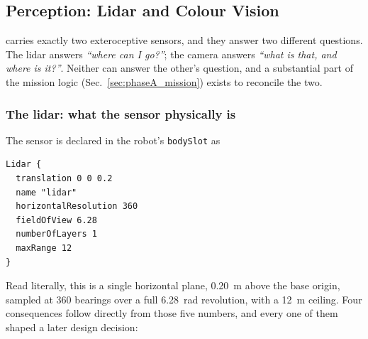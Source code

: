 \subsection{Perception: Lidar and Colour Vision}
\label{sec:phaseA_perception}

\phaseA{} carries exactly two exteroceptive sensors, and they answer two
different questions. The lidar answers \emph{``where can I go?''}; the
camera answers \emph{``what is that, and where is it?''}. Neither can
answer the other's question, and a substantial part of the mission logic
(Sec.~\ref{sec:phaseA_mission}) exists to reconcile the two.

\subsubsection{The lidar: what the sensor physically is}

The sensor is declared in the robot's \texttt{bodySlot} as

\begin{lstlisting}[style=xml]
Lidar {
  translation 0 0 0.2
  name "lidar"
  horizontalResolution 360
  fieldOfView 6.28
  numberOfLayers 1
  maxRange 12
}
\end{lstlisting}

Read literally, this is a single horizontal plane, \SI{0.20}{m} above the
base origin, sampled at 360 bearings over a full \SI{6.28}{rad}
revolution, with a \SI{12}{m} ceiling. Four consequences follow directly
from those five numbers, and every one of them shaped a later design
decision:

